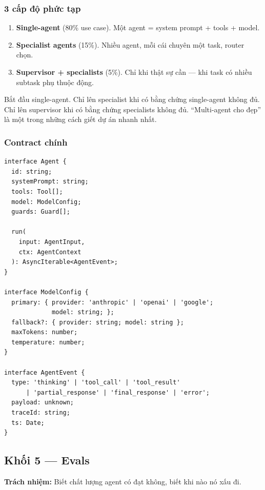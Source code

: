 \documentclass[11pt,a4paper]{article}
\begin{document}
\subsubsection*{3 cấp độ phức tạp}

\begin{enumerate}
\item \textbf{Single-agent} (80\% use case). Một agent = system prompt + tools + model.
\item \textbf{Specialist agents} (15\%). Nhiều agent, mỗi cái chuyên một task, router chọn.
\item \textbf{Supervisor + specialists} (5\%). Chỉ khi thật sự cần --- khi task có nhiều subtask phụ thuộc động.
\end{enumerate}

\begin{warnbox}[title=Nguyên tắc vàng]
Bắt đầu single-agent. Chỉ lên specialist khi có bằng chứng single-agent không
đủ. Chỉ lên supervisor khi có bằng chứng specialists không đủ.
``Multi-agent cho đẹp'' là một trong những cách giết dự án nhanh nhất.
\end{warnbox}

\subsubsection*{Contract chính}

\begin{lstlisting}
interface Agent {
  id: string;
  systemPrompt: string;
  tools: Tool[];
  model: ModelConfig;
  guards: Guard[];

  run(
    input: AgentInput,
    ctx: AgentContext
  ): AsyncIterable<AgentEvent>;
}

interface ModelConfig {
  primary: { provider: 'anthropic' | 'openai' | 'google';
             model: string; };
  fallback?: { provider: string; model: string };
  maxTokens: number;
  temperature: number;
}

interface AgentEvent {
  type: 'thinking' | 'tool_call' | 'tool_result'
      | 'partial_response' | 'final_response' | 'error';
  payload: unknown;
  traceId: string;
  ts: Date;
}
\end{lstlisting}

\subsection{Khối 5 — Evals}

\textbf{Trách nhiệm:} Biết chất lượng agent có đạt không, biết khi nào nó xấu đi.
\end{document}
